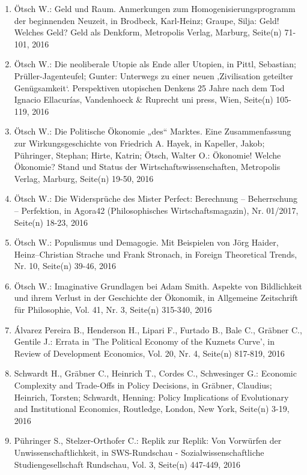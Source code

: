 \begin{enumerate}
    	 \item Ötsch W.: Geld und Raum. Anmerkungen zum Homogenisierungsprogramm der beginnenden Neuzeit, in Brodbeck, Karl-Heinz; Graupe, Silja: Geld! Welches Geld? Geld als Denkform, Metropolis Verlag, Marburg, Seite(n) 71-101, 2016
	 \item Ötsch W.: Die neoliberale Utopie als Ende aller Utopien, in Pittl, Sebastian; Prüller-Jagenteufel; Gunter: Unterwegs zu einer neuen ‚Zivilisation geteilter Genügsamkeit‘. Perspektiven utopischen Denkens 25 Jahre nach dem Tod Ignacio Ellacurías, Vandenhoeck & Ruprecht uni press, Wien, Seite(n) 105-119, 2016
	 \item Ötsch W.: Die Politische Ökonomie „des“ Marktes. Eine Zusammenfassung zur Wirkungsgeschichte von Friedrich A. Hayek, in Kapeller, Jakob; Pühringer, Stephan; Hirte, Katrin; Ötsch, Walter O.: Ökonomie! Welche Ökonomie? Stand und Status der Wirtschaftswissenschaften, Metropolis Verlag, Marburg, Seite(n) 19-50, 2016
	 \item Ötsch W.: Die Widersprüche des Mister Perfect: Berechnung – Beherrschung – Perfektion, in Agora42 (Philosophisches Wirtschaftsmagazin), Nr. 01/2017, Seite(n) 18-23, 2016
	 \item Ötsch W.: Populismus und Demagogie. Mit Beispielen von Jörg Haider, Heinz–Christian Strache und Frank Stronach, in Foreign Theoretical Trends, Nr. 10, Seite(n) 39-46, 2016
	 \item Ötsch W.: Imaginative Grundlagen bei Adam Smith. Aspekte von Bildlichkeit und ihrem Verlust in der Geschichte der Ökonomik, in Allgemeine Zeitschrift für Philosophie, Vol. 41, Nr. 3, Seite(n) 315-340, 2016
	 \item Álvarez Pereira B., Henderson H., Lipari F., Furtado B., Bale C., Gräbner C., Gentile J.: Errata in 'The Political Economy of the Kuznets Curve', in Review of Development Economics, Vol. 20, Nr. 4, Seite(n) 817-819, 2016
	 \item Schwardt H., Gräbner C., Heinrich T., Cordes C., Schwesinger G.: Economic Complexity and Trade-Offs in Policy Decisions, in Gräbner, Claudius; Heinrich, Torsten; Schwardt, Henning: Policy Implications of Evolutionary and Institutional Economics, Routledge, London, New York, Seite(n) 3-19, 2016
	 \item Pühringer S., Stelzer-Orthofer C.: Replik zur Replik: Von Vorwürfen der Unwissenschaftlichkeit, in SWS-Rundschau - Sozialwissenschaftliche Studiengesellschaft Rundschau, Vol. 3, Seite(n) 447-449, 2016

\end{enumerate}
